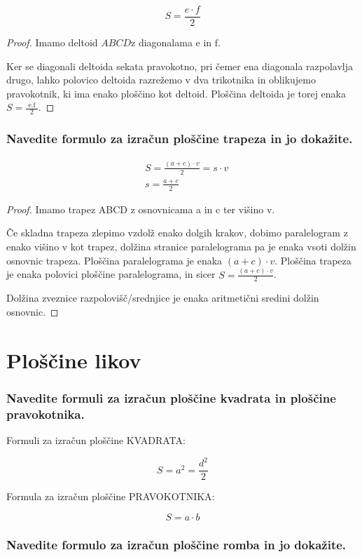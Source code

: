 \documentclass{article}
\begin{document}
$$
S=\frac{e \cdot f}{2}
$$

\begin{proof}
    Imamo deltoid $A B C D \mathrm{z}$ diagonalama e in $\mathrm{f}$.

Ker se diagonali deltoida sekata pravokotno, pri čemer ena diagonala razpolavlja drugo, lahko polovico deltoida razrežemo v dva trikotnika in oblikujemo pravokotnik, ki ima enako ploščino kot deltoid. Ploščina deltoida je torej enaka $S=\frac{\text { e.f }}{2}$.
\end{proof}

\subsubsection*{Navedite formulo za izračun ploščine trapeza in jo dokažite.}

$$
\begin{aligned}
& S=\frac{(a+c) \cdot v}{2}=s \cdot v \\
& s=\frac{a+c}{2}
\end{aligned}
$$

\begin{proof}
    Imamo trapez ABCD z osnovnicama a in c ter višino v.

Če skladna trapeza zlepimo vzdolž enako dolgih krakov, dobimo paralelogram z enako višino v kot trapez, dolžina stranice paralelograma pa je enaka vsoti dolžin osnovnic trapeza. Ploščina paralelograma je enaka $(a+c) \cdot v$. Ploščina trapeza je enaka polovici ploščine paralelograma, in sicer $S=\frac{(a+c) \cdot v}{2}$.

Dolžina zveznice razpolovišč/srednjice je enaka aritmetični sredini dolžin osnovnic.
\end{proof}
\section{Ploščine likov}
\subsubsection*{Navedite formuli za izračun ploščine kvadrata in ploščine pravokotnika.}

Formuli za izračun ploščine KVADRATA:

$$
S=a^{2}=\frac{d^{2}}{2}
$$

Formula za izračun ploščine PRAVOKOTNIKA:

$$
S=a \cdot b
$$

\subsubsection*{Navedite formulo za izračun ploščine romba in jo dokažite.}
\end{document}
